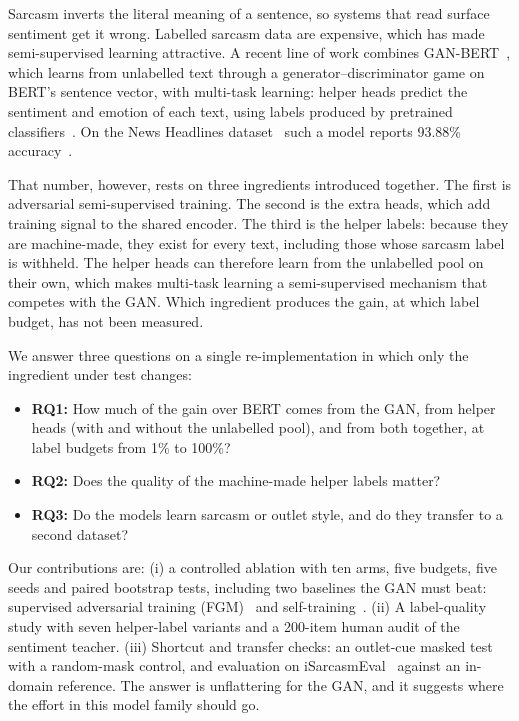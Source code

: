 \documentclass[conference]{IEEEtran}
\begin{document}
Sarcasm inverts the literal meaning of a sentence, so systems that read surface sentiment get it wrong. Labelled sarcasm data are expensive, which has made semi-supervised learning attractive. A recent line of work combines GAN-BERT~\cite{croce2020ganbert}, which learns from unlabelled text through a generator--discriminator game on BERT's sentence vector, with multi-task learning: helper heads predict the sentiment and emotion of each text, using labels produced by pretrained classifiers~\cite{irfan2025seed}. On the News Headlines dataset~\cite{misra2023sarcasm} such a model reports 93.88\% accuracy~\cite{irfan2025seed}.

That number, however, rests on three ingredients introduced together. The first is adversarial semi-supervised training. The second is the extra heads, which add training signal to the shared encoder. The third is the helper labels: because they are machine-made, they exist for every text, including those whose sarcasm label is withheld. The helper heads can therefore learn from the unlabelled pool on their own, which makes multi-task learning a semi-supervised mechanism that competes with the GAN. Which ingredient produces the gain, at which label budget, has not been measured.

We answer three questions on a single re-implementation in which only the ingredient under test changes:
\begin{itemize}
\item \textbf{RQ1:} How much of the gain over BERT comes from the GAN, from helper heads (with and without the unlabelled pool), and from both together, at label budgets from 1\% to 100\%?
\item \textbf{RQ2:} Does the quality of the machine-made helper labels matter?
\item \textbf{RQ3:} Do the models learn sarcasm or outlet style, and do they transfer to a second dataset?
\end{itemize}

Our contributions are: (i) a controlled ablation with ten arms, five budgets, five seeds and paired bootstrap tests, including two baselines the GAN must beat: supervised adversarial training (FGM)~\cite{miyato2017adversarial} and self-training~\cite{lee2013pseudo}. (ii) A label-quality study with seven helper-label variants and a 200-item human audit of the sentiment teacher. (iii) Shortcut and transfer checks: an outlet-cue masked test with a random-mask control, and evaluation on iSarcasmEval~\cite{abufarha2022semeval} against an in-domain reference. The answer is unflattering for the GAN, and it suggests where the effort in this model family should go.
\end{document}

